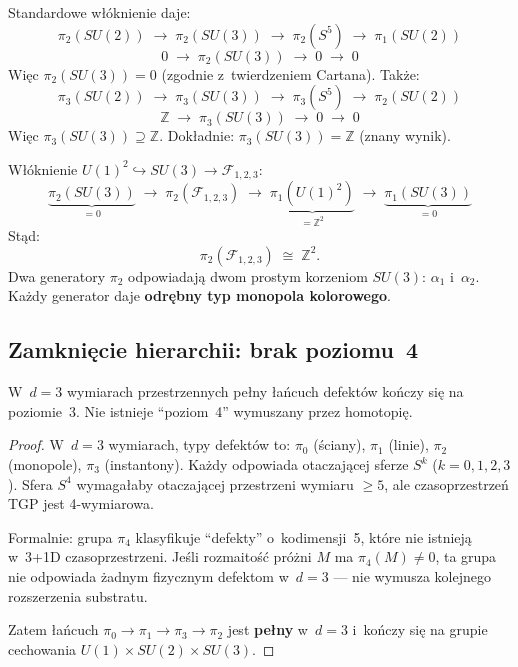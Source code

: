 \begin{lemma}%
\label{lem:D2-SU3-fibration}
Standardowe w\l{}\'oknienie daje:
\[
  \pi_2(SU(2)) \;\to\; \pi_2(SU(3)) \;\to\; \pi_2(S^5)
  \;\to\; \pi_1(SU(2))
\]
\[
  0 \;\to\; \pi_2(SU(3)) \;\to\; 0 \;\to\; 0
\]
Wi\k{e}c $\pi_2(SU(3)) = 0$ (zgodnie z~twierdzeniem Cartana).
Tak\.ze:
\[
  \pi_3(SU(2)) \;\to\; \pi_3(SU(3)) \;\to\; \pi_3(S^5)
  \;\to\; \pi_2(SU(2))
\]
\[
  \mathbb{Z} \;\to\; \pi_3(SU(3)) \;\to\; 0 \;\to\; 0
\]
Wi\k{e}c $\pi_3(SU(3)) \supseteq \mathbb{Z}$.
Dok\l{}adnie: $\pi_3(SU(3)) = \mathbb{Z}$ (znany wynik).
\end{lemma}

\begin{lemma}\label{lem:D2-torus}
W\l{}\'oknienie $U(1)^2 \hookrightarrow SU(3) \to \mathcal{F}_{1,2,3}$:
\[
  \underbrace{\pi_2(SU(3))}_{= 0}
  \;\to\; \pi_2(\mathcal{F}_{1,2,3})
  \;\to\; \underbrace{\pi_1(U(1)^2)}_{= \mathbb{Z}^2}
  \;\to\; \underbrace{\pi_1(SU(3))}_{= 0}
\]
St\k{a}d:
\begin{equation}\label{eq:D2-flag-final}
  \pi_2(\mathcal{F}_{1,2,3}) \;\cong\; \mathbb{Z}^2.
\end{equation}
Dwa generatory $\pi_2$ odpowiadaj\k{a} dwom prostym korzeniom
$SU(3)$: $\alpha_1$ i~$\alpha_2$. Ka\.zdy generator daje
\textbf{odr\k{e}bny typ monopola kolorowego}.
\end{lemma}

\subsection{Zamkni\k{e}cie hierarchii: brak poziomu~4}%
\label{ssec:D2-closure}

\begin{proposition}%
\label{prop:D2-closure}

W~$d = 3$ wymiarach przestrzennych pe\l{}ny \l{}a\'ncuch
defekt\'ow ko\'nczy si\k{e} na poziomie~3.
Nie istnieje ``poziom~4'' wymuszany przez homotopi\k{e}.
\end{proposition}

\begin{proof}
W~$d = 3$ wymiarach, typy defekt\'ow to:
$\pi_0$ (\'sciany), $\pi_1$ (linie), $\pi_2$ (monopole),
$\pi_3$ (instantony). Ka\.zdy odpowiada otaczaj\k{a}cej
sferze $S^k$ ($k = 0, 1, 2, 3$). Sfera $S^4$ wymaga\l{}aby
otaczaj\k{a}cej przestrzeni wymiaru $\geq 5$, ale
czasoprzestrze\'n TGP jest 4-wymiarowa.

Formalnie: grupa $\pi_4$ klasyfikuje ``defekty'' o~kodimensji~5,
kt\'ore nie istniej\k{a} w~3+1D czasoprzestrzeni.
Je\'sli rozmaito\'s\'c pr\'o\.zni $M$ ma $\pi_4(M) \neq 0$,
ta grupa nie odpowiada \.zadnym fizycznym defektom
w~$d = 3$ --- nie wymusza kolejnego rozszerzenia substratu.

Zatem \l{}a\'ncuch $\pi_0 \to \pi_1 \to \pi_3 \to \pi_2$
jest \textbf{pe\l{}ny} w~$d = 3$ i~ko\'nczy si\k{e}
na grupie cechowania $U(1) \times SU(2) \times SU(3)$.
\end{proof}

